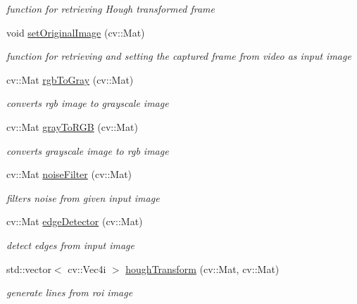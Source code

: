 \begin{DoxyCompactItemize}
\begin{DoxyCompactList}\small\item\em function for retrieving Hough transformed frame \end{DoxyCompactList}\item 
void \hyperlink{classimageProcessor_a95a83955f7a69f5e4d1b74030e32a27f}{set\+Original\+Image} (cv\+::\+Mat)
\begin{DoxyCompactList}\small\item\em function for retrieving and setting the captured frame from video as input image \end{DoxyCompactList}\item 
cv\+::\+Mat \hyperlink{classimageProcessor_abfe9be72666f5779b2abe3df018442cf}{rgb\+To\+Gray} (cv\+::\+Mat)
\begin{DoxyCompactList}\small\item\em converts rgb image to grayscale image \end{DoxyCompactList}\item 
cv\+::\+Mat \hyperlink{classimageProcessor_a704c39f5acb8f8f05f711300de0b4d81}{gray\+To\+R\+GB} (cv\+::\+Mat)
\begin{DoxyCompactList}\small\item\em converts grayscale image to rgb image \end{DoxyCompactList}\item 
cv\+::\+Mat \hyperlink{classimageProcessor_ad2578845d7ece8d5e187eddad9fa2b09}{noise\+Filter} (cv\+::\+Mat)
\begin{DoxyCompactList}\small\item\em filters noise from given input image \end{DoxyCompactList}\item 
cv\+::\+Mat \hyperlink{classimageProcessor_a2be1acf803ab26d3ba83a668f9a7a987}{edge\+Detector} (cv\+::\+Mat)
\begin{DoxyCompactList}\small\item\em detect edges from input image \end{DoxyCompactList}\item 
std\+::vector$<$ cv\+::\+Vec4i $>$ \hyperlink{classimageProcessor_a8718011326c36251f8e1607694d21523}{hough\+Transform} (cv\+::\+Mat, cv\+::\+Mat)
\begin{DoxyCompactList}\small\item\em generate lines from roi image \end{DoxyCompactList}\end{DoxyCompactItemize}


